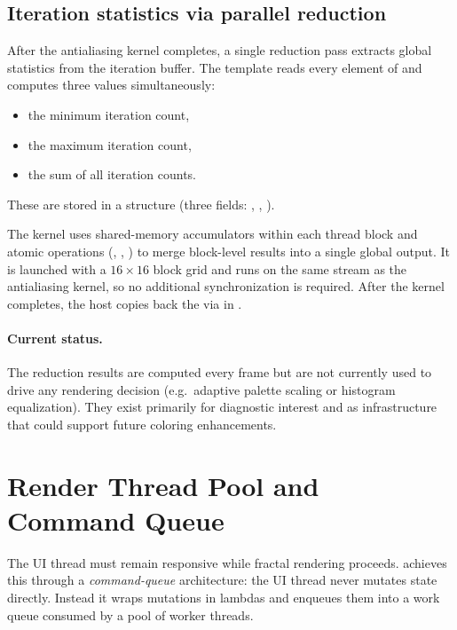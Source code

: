 \subsection{Iteration statistics via parallel reduction}
\label{subsec:reduction}

After the antialiasing kernel completes, a single reduction pass
extracts global statistics from the iteration buffer.  The
 template reads every element of
 and computes three values simultaneously:
\begin{itemize}
  \item the minimum iteration count,
  \item the maximum iteration count,
  \item the sum of all iteration counts.
\end{itemize}
These are stored in a  structure
(three  fields: , , ).

The kernel uses shared-memory accumulators within each thread block
and atomic operations (, ,
) to merge block-level results into a single global
output.  It is launched with a $16\times16$ block grid and runs on
the same stream as the antialiasing kernel, so no additional
synchronization is required.  After the kernel completes, the host
copies back the  via  in
.

\paragraph{Current status.}
The reduction results are computed every frame but are not currently
used to drive any rendering decision (e.g.\ adaptive palette scaling
or histogram equalization).  They exist primarily for diagnostic
interest and as infrastructure that could support future coloring
enhancements.


\section{Render Thread Pool and Command Queue}
\label{sec:render-thread-pool}

The UI thread must remain responsive while fractal rendering proceeds.
\FractalShark{} achieves this through a \emph{command-queue} architecture:
the UI thread never mutates  state directly.  Instead it wraps
mutations in lambdas and enqueues them into a work queue consumed by a pool of
worker threads.

